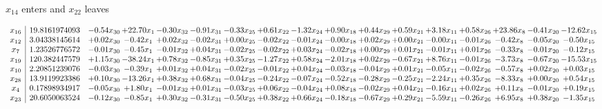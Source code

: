\documentclass[9pt]{article}
\begin{document}
 $ x_{14} $ enters and $ x_{22} $ leaves 

 \[\begin{array}{c| c c@{\hskip 2pt} c@{\hskip 2pt} c@{\hskip 2pt} c@{\hskip 2pt} c@{\hskip 2pt} c@{\hskip 2pt} c@{\hskip 2pt} c@{\hskip 2pt} c@{\hskip 2pt} c@{\hskip 2pt} c@{\hskip 2pt} c@{\hskip 2pt} c@{\hskip 2pt} c@{\hskip 2pt} c@{\hskip 2pt} }
 x_{16}   &  19.8161974093 & -0.54 x_{30} & + 22.70 x_{1} & -0.30 x_{32} & -0.91 x_{31} & -0.33 x_{25} & +  0.61 x_{22} & -1.32 x_{24} & +  0.90 x_{18} & +  0.44 x_{29} & +  0.59 x_{21} & +  3.18 x_{11} & +  0.58 x_{26} & + 23.86 x_{8} & -0.41 x_{20} & -12.62 x_{15}\\
 x_{12}   &  3.04338145614 & +  0.02 x_{30} & -0.42 x_{1} & +  0.02 x_{32} & -0.02 x_{31} & +  0.00 x_{25} & -0.02 x_{22} & -0.01 x_{24} & -0.00 x_{18} & +  0.02 x_{29} & +  0.00 x_{21} & -0.00 x_{11} & -0.01 x_{26} & -0.42 x_{8} & -0.05 x_{20} & -0.50 x_{15}\\
 x_{7}   &  1.23526776572 & -0.01 x_{30} & -0.45 x_{1} & -0.01 x_{32} & +  0.04 x_{31} & -0.02 x_{25} & -0.02 x_{22} & +  0.03 x_{24} & -0.02 x_{18} & +  0.00 x_{29} & +  0.01 x_{21} & -0.01 x_{11} & +  0.01 x_{26} & -0.33 x_{8} & -0.01 x_{20} & -0.12 x_{15}\\
 x_{19}   &  120.382447579 & +  1.15 x_{30} & -38.24 x_{1} & +  0.78 x_{32} & -0.85 x_{31} & +  0.35 x_{25} & -1.27 x_{22} & +  0.58 x_{24} & -2.01 x_{18} & +  0.02 x_{29} & -0.67 x_{21} & +  8.76 x_{11} & -0.01 x_{26} & -3.73 x_{8} & -0.67 x_{20} & -15.53 x_{15}\\
 x_{10}   &  2.20851239076 & -0.03 x_{30} & -0.39 x_{1} & +  0.01 x_{32} & +  0.04 x_{31} & -0.02 x_{25} & -0.01 x_{22} & +  0.04 x_{24} & -0.03 x_{18} & -0.04 x_{29} & +  0.01 x_{21} & -0.05 x_{11} & -0.02 x_{26} & -0.57 x_{8} & +  0.02 x_{20} & +  0.03 x_{15}\\
 x_{28}   &  13.9119923386 & +  0.10 x_{30} & -13.26 x_{1} & +  0.38 x_{32} & +  0.68 x_{31} & -0.04 x_{25} & -0.24 x_{22} & -0.07 x_{24} & -0.52 x_{18} & -0.28 x_{29} & -0.25 x_{21} & -2.24 x_{11} & +  0.35 x_{26} & -8.33 x_{8} & +  0.00 x_{20} & +  0.54 x_{15}\\
 x_{4}   &  0.17898934917 & -0.05 x_{30} & +  1.80 x_{1} & -0.01 x_{32} & +  0.01 x_{31} & -0.03 x_{25} & +  0.06 x_{22} & -0.04 x_{24} & +  0.08 x_{18} & -0.02 x_{29} & +  0.04 x_{21} & -0.16 x_{11} & +  0.02 x_{26} & +  0.11 x_{8} & -0.01 x_{20} & +  0.19 x_{15}\\
 x_{23}   &  20.6050063524 & -0.12 x_{30} & -0.85 x_{1} & +  0.30 x_{32} & -0.31 x_{31} & -0.50 x_{25} & +  0.38 x_{22} & +  0.66 x_{24} & -0.18 x_{18} & -0.67 x_{29} & +  0.29 x_{21} & -5.59 x_{11} & -0.26 x_{26} & +  6.95 x_{8} & +  0.38 x_{20} & -1.35 x_{15}\\

\end{array}\]
\end{document}
